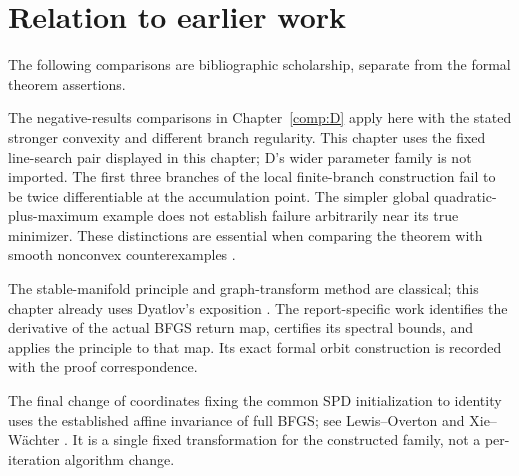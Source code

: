 \endgroup


\section*{Relation to earlier work}
The following comparisons are bibliographic scholarship, separate from the formal theorem assertions.

The negative-results comparisons in Chapter~\ref{comp:D} apply here with the stated stronger convexity and different branch regularity. This chapter uses the fixed line-search pair displayed in this chapter; D's wider parameter family is not imported. The first three branches of the local finite-branch construction fail to be twice differentiable at the accumulation point. The simpler global quadratic-plus-maximum example does not establish failure arbitrarily near its true minimizer. These distinctions are essential when comparing the theorem with smooth nonconvex counterexamples \cite{NEG_M07,NEG_M14,NEG_DIAO26}.

The stable-manifold principle and graph-transform method are classical; this chapter already uses Dyatlov's exposition \cite[Sections 3--4]{DY}. The report-specific work identifies the derivative of the actual BFGS return map, certifies its spectral bounds, and applies the principle to that map. Its exact formal orbit construction is recorded with the proof correspondence.

The final change of coordinates fixing the common SPD initialization to identity uses the established affine invariance of full BFGS; see Lewis--Overton \cite[Section 2]{LO} and Xie--W\"achter \cite[Theorem II.1]{XW}. It is a single fixed transformation for the constructed family, not a per-iteration algorithm change.
